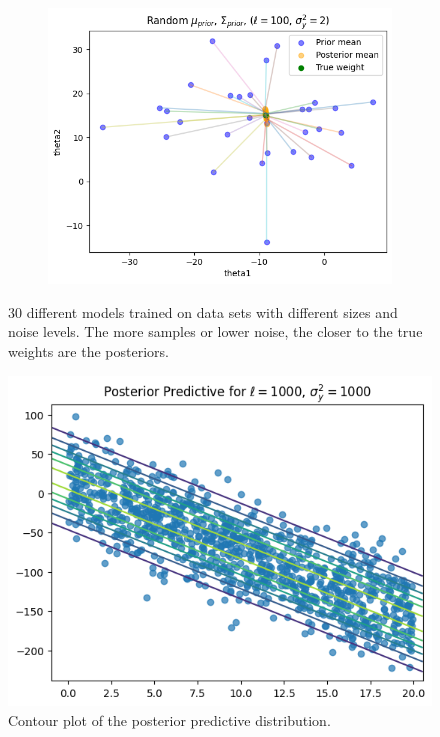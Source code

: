 \begin{figure}[H]
\begin{subfigure}{.5\textwidth}
\end{subfigure}%
\begin{subfigure}{.5\textwidth}
  \includegraphics[width=1\textwidth]{assets/week1/random-priors-new-many-inaccurate.png}
\end{subfigure}
\caption{30 different models trained on data sets with different sizes and noise levels. The more samples or lower noise, the closer to the true weights are the posteriors.}
\label{fig:random-prior}
\end{figure}

\begin{figure}[H]
\centering
\includegraphics[width=.7\textwidth]{assets/week1/noise-1000.png}
\caption{Contour plot of the posterior predictive distribution.}
\label{fig:posterior-predictive}
\end{figure}
